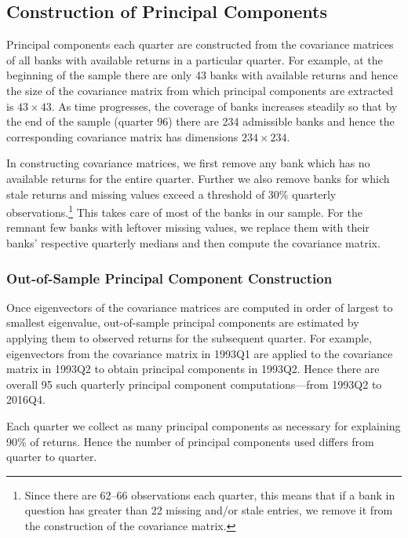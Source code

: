 \documentclass[11pt,]{article}
\let\rmarkdownfootnote\footnote%
\def\footnote{\protect\rmarkdownfootnote}
\begin{document}
\subsection{Construction of Principal
Components}\label{construction-of-principal-components}

Principal components each quarter are constructed from the covariance
matrices of all banks with available returns in a particular quarter.
For example, at the beginning of the sample there are only 43 banks with
available returns and hence the size of the covariance matrix from which
principal components are extracted is \(43\times 43\). As time
progresses, the coverage of banks increases steadily so that by the end
of the sample (quarter 96) there are 234 admissible banks and hence the
corresponding covariance matrix has dimensions \(234\times 234\).

In constructing covariance matrices, we first remove any bank which has
no available returns for the entire quarter. Further we also remove
banks for which stale returns and missing values exceed a threshold of
30\% quarterly observations.\footnote{Since there are 62--66
  observations each quarter, this means that if a bank in question has
  greater than 22 missing and/or stale entries, we remove it from the
  construction of the covariance matrix.} This takes care of most of the
banks in our sample. For the remnant few banks with leftover missing
values, we replace them with their banks' respective quarterly medians
and then compute the covariance matrix.

\subsubsection{Out-of-Sample Principal Component
Construction}\label{out-of-sample-principal-component-construction}

Once eigenvectors of the covariance matrices are computed in order of
largest to smallest eigenvalue, out-of-sample principal components are
estimated by applying them to observed returns for the subsequent
quarter. For example, eigenvectors from the covariance matrix in 1993Q1
are applied to the covariance matrix in 1993Q2 to obtain principal
components in 1993Q2. Hence there are overall 95 such quarterly
principal component computations---from 1993Q2 to 2016Q4.

Each quarter we collect as many principal components as necessary for
explaining 90\% of returns. Hence the number of principal components
used differs from quarter to quarter.
\end{document}

